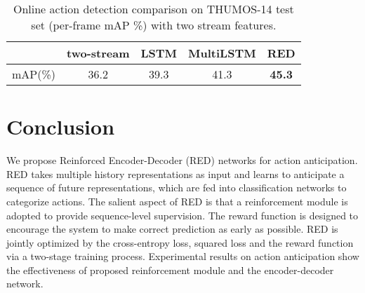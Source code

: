\documentclass{bmvc2k}
\begin{document}
\begin{table}[h]
\centering
\caption{Online action detection comparison on THUMOS-14 test set (per-frame mAP \%) with two stream features. }
\label{thumos-online}
\begin{tabular}{l|cccc}
\hline
    & two-stream\cite{simonyan2014two} & LSTM\cite{yeung2015every} & MultiLSTM\cite{yeung2015every} & RED \\ \hline
mAP(\%) &  36.2  &   39.3  &  41.3  &  \textbf{45.3}   \\ \hline
\end{tabular}
\end{table}



\section{Conclusion}
We propose Reinforced Encoder-Decoder (RED) networks for action anticipation. RED takes multiple history representations as input and learns to anticipate a sequence of future representations, which are fed into classification networks to categorize actions. The salient aspect of RED is that a reinforcement module is adopted to provide sequence-level supervision. The reward function is designed to encourage the system to make correct prediction as early as possible. RED is jointly optimized by the cross-entropy loss, squared loss and the reward function via a two-stage training process. Experimental results on action anticipation show the effectiveness of proposed reinforcement module and the encoder-decoder network. 


\end{document}
